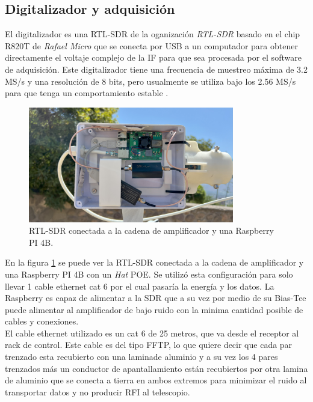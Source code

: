\subsection{Digitalizador y adquisición}

El digitalizador es una RTL-SDR de la oganización \textit{RTL-SDR} basado en el chip R820T de \textit{Rafael Micro} que se conecta por USB a un computador para obtener directamente el voltaje complejo de la IF para que sea procesada por el software de adquisición. Este digitalizador tiene una frecuencia de muestreo máxima de 3.2 MS/s y una resolución de 8 bits, pero usualmente se utiliza bajo los 2.56 MS/s para que tenga un comportamiento estable \cite{RTLSDR2018}.\\

\begin{figure}
    \centering
    \includegraphics[width=0.8\textwidth]{img/rpiRtlSaw}
    \caption{RTL-SDR conectada a la cadena de amplificador y una Raspberry PI 4B.}
    \label{fig:digitalizador}
\end{figure}

En la figura \ref{fig:digitalizador} se puede ver la RTL-SDR conectada a la cadena de amplificador y una Raspberry PI 4B con un \textit{Hat} POE. Se utilizó esta configuración para solo llevar 1 cable ethernet cat 6 por el cual pasaría la energía y los datos. La Raspberry es capaz de alimentar a la SDR que a su vez por medio de su Bias-Tee puede alimentar al amplificador de bajo ruido con la minima cantidad posible de cables y conexiones.\\

El cable ethernet utilizado es un cat 6 de 25 metros, que va desde el receptor al rack de control. Este cable es del tipo FFTP, lo que quiere decir que cada par trenzado esta recubierto con una laminade aluminio y a su vez los 4 pares trenzados más un conductor de apantallamiento están recubiertos por otra lamina de aluminio que se conecta a tierra en ambos extremos para minimizar el ruido al transportar datos y no producir RFI al telescopio.\\

